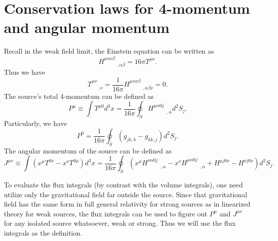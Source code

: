 \section{Conservation laws for 4-momentum and angular momentum}
Recall in the weak field limit, the Einstein equation can be written as
\[H^{\mu\alpha\nu\beta}_{\phantom{****},\alpha
\beta} = 16\pi T^{\mu\nu}.\]
Thus we have
\[T^{\mu\nu}_{\phantom{**},\nu} = \frac{1}{16\pi}H^{\mu\alpha\nu\beta}_{\phantom{****},\alpha\beta\nu} = 0.\]
The source's total 4-momentum can be defined as
\[P^{\mu} \equiv \int T^{\mu 0}d^3x = \frac{1}{16\pi} \oint_{S} H^{\mu\alpha 0 j}_{\phantom{****},\alpha} d^2 S_j .\]
Particularly, we have
\[P^0 = \frac{1}{16\pi} \oint_{S} (g_{jk,k} - g_{kk,j})d^2S_{j} .\]
The angular momentum of the source can be defined as
\[J^{\mu\nu} \equiv \int (x^{\mu} T^{0\nu} - x^{\nu} T^{0\mu}) d^3x  = \frac{1}{16\pi} \oint_S (x^{\mu}H^{\nu\alpha 0 j}_{\phantom{****},\alpha} - x^{\nu}H^{\mu\alpha 0 j}_{\phantom{****},\alpha} + H^{\mu j 0 \nu} - H^{\nu j 0 \nu}) d^2 S_j .\]
\begin{note}
To evaluate the flux integrals (by contrast with the volume
integrals), one need utilize only the gravitational field far outside the source. Since that gravitational field has the same form in full general relativity for strong sources as in linearized theory for weak sources, the flux integrals can be used to figure out $P^{\mu}$ and $J^{\mu\nu}$ for any isolated source whatsoever, weak or strong. Thus we will use the flux integrals as the definition.
\end{note}

